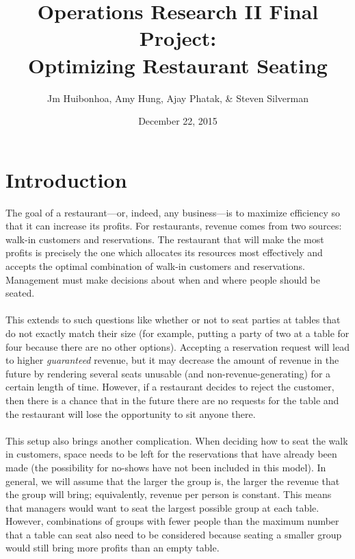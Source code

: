 \documentclass[12pt, titlepage]{article}
\begin{document}

\title{\Huge{Operations Research II Final Project:\\Optimizing Restaurant Seating}}
\author{\Large{Jm Huibonhoa, Amy Hung, Ajay Phatak, \& Steven Silverman}}
\date{December 22, 2015}

\maketitle

\tableofcontents
\newpage

\section{Introduction}

The goal of a restaurant---or, indeed, any business---is to maximize efficiency so that it can increase its profits. For restaurants, revenue comes from two sources: walk-in customers and reservations. The restaurant that will make the most profits is precisely the one which allocates its resources most effectively and accepts the optimal combination of walk-in customers and reservations. Management must make decisions about when and where people should be seated.\\
\\
This extends to such questions like whether or not to seat parties at tables that do not exactly match their size (for example, putting a party of two at a table for four because there are no other options). Accepting a reservation request will lead to higher \textit{guaranteed} revenue, but it may decrease the amount of revenue in the future by rendering several seats unusable (and non-revenue-generating) for a certain length of time. However, if a restaurant decides to reject the customer, then there is a chance that in the future there are no requests for the table and the restaurant will lose the opportunity to sit anyone there.\\
\\
This setup also brings another complication. When deciding how to seat the walk in customers, space needs to be left for the reservations that have already been made (the possibility for no-shows have not been included in this model). In general, we will assume that the larger the group is, the larger the revenue that the group will bring; equivalently, revenue per person is constant. This means that  managers would want to seat the largest possible group at each table. However, combinations of groups with fewer people than the maximum number that a table can seat also need to be considered because seating a smaller group would still bring more profits than an empty table.
\end{document}
